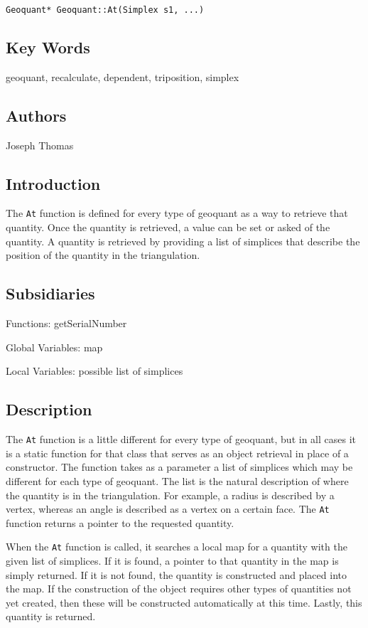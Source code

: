 \documentclass[12pt]{article}%
\begin{document}
\texttt{Geoquant* Geoquant::At(Simplex s1, ...)}

\subsection*{Key Words}
geoquant, recalculate, dependent, triposition, simplex

\subsection*{Authors}
Joseph Thomas

\subsection*{Introduction}
The \texttt{At} function is defined for every type of geoquant as a way to retrieve that quantity. Once the quantity is retrieved, a value can be set or asked of the quantity. A quantity is retrieved by providing a list of simplices that describe the position of the quantity in the triangulation. \	

\subsection*{Subsidiaries}

Functions: getSerialNumber

Global Variables: map

Local Variables: possible list of simplices

\subsection*{Description}
The \texttt{At} function is a little different for every type of geoquant, but in all cases it is a static function for that class that serves as an object retrieval in place of a constructor. The function takes as a parameter a list of simplices which may be different for each type of geoquant. The list is the natural description of where the quantity is in the triangulation. For example, a radius is described by a vertex, whereas an angle is described as a vertex on a certain face. The \texttt{At} function returns a pointer to the requested quantity. \	

When the \texttt{At} function is called, it searches a local map for a quantity with the given list of simplices. If it is found, a pointer to that quantity in the map is simply returned. If it is not found, the quantity is constructed and placed into the map. If the construction of the object requires other types of quantities not yet created, then these will be constructed automatically at this time. Lastly, this quantity is returned. \	
\end{document}
